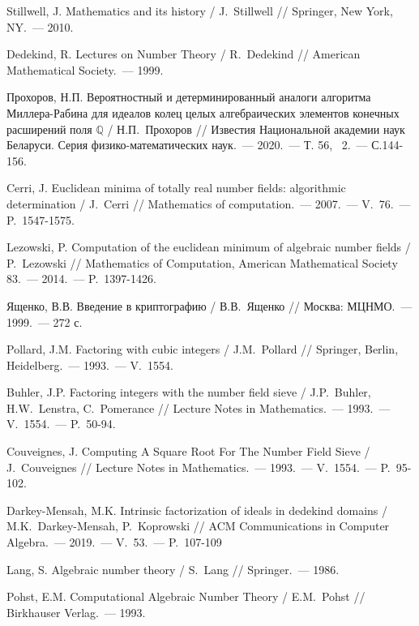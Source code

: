 \documentclass[_00_dissertation.tex]{subfiles}
\begin{document}
\begin{thebibliography}{99}
    Stillwell, J. Mathematics and its history / J.~Stillwell // Springer, New York, NY.~--- 2010.

    Dedekind, R. Lectures on Number Theory / R.~Dedekind // American Mathematical Society.~--- 1999.

    Прохоров, Н.П. Вероятностный и детерминированный аналоги алгоритма Миллера-Рабина для идеалов колец целых алгебраических элементов конечных расширений поля $\mathbb{Q}$ / Н.П.~Прохоров // Известия Национальной академии наук Беларуси. Серия физико-математических наук.~--- 2020.~--- Т. 56, \textnumero~2.~--- С.144-156.

    Cerri, J. Euclidean minima of totally real number fields: algorithmic determination / J.~Cerri // Mathematics of computation.~--- 2007.~--- V.~76.~--- P.~1547-1575.

    Lezowski, P. Computation of the euclidean minimum of algebraic number fields / P.~Lezowski // Mathematics of Computation, American Mathematical Society 83.~--- 2014.~--- P.~1397-1426.

    Ященко, В.В. Введение в криптографию / В.В.~Ященко // Москва: МЦНМО.~--- 1999.~--- 272 с.
    
    Pollard, J.M. Factoring with cubic integers / J.M.~Pollard // Springer, Berlin, Heidelberg.~--- 1993.~--- V.~1554.

    Buhler, J.P. Factoring integers with the number field sieve / J.P.~Buhler, H.W.~Lenstra, C.~Pomerance // Lecture Notes in Mathematics.~--- 1993.~--- V.~1554.~--- P.~50-94.

    Couveignes, J. Computing A Square Root For The Number Field Sieve / J.~Couveignes // Lecture Notes in Mathematics.~--- 1993.~--- V.~1554.~--- P.~95-102.

    Darkey-Mensah, M.K. Intrinsic factorization of ideals in dedekind domains / M.K.~Darkey-Mensah, P.~Koprowski // ACM Communications in Computer Algebra.~--- 2019.~--- V.~53.~--- P.~107-109

    Lang, S. Algebraic number theory / S.~Lang // Springer.~--- 1986.

    Pohst, E.M. Computational Algebraic Number Theory / E.M.~Pohst // Birkhauser Verlag.~--- 1993.


\end{thebibliography}
\end{document}
